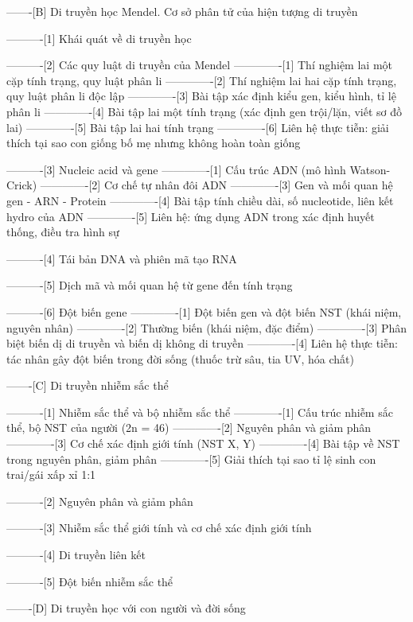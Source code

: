 -------[B] Di truyền học Mendel. Cơ sở phân tử của hiện tượng di truyền

----------[1] Khái quát về di truyền học

----------[2] Các quy luật di truyền của Mendel
-------------[1] Thí nghiệm lai một cặp tính trạng, quy luật phân li
-------------[2] Thí nghiệm lai hai cặp tính trạng, quy luật phân li độc lập
-------------[3] Bài tập xác định kiểu gen, kiểu hình, tỉ lệ phân li
-------------[4] Bài tập lai một tính trạng (xác định gen trội/lặn, viết sơ đồ lai)
-------------[5] Bài tập lai hai tính trạng
-------------[6] Liên hệ thực tiễn: giải thích tại sao con giống bố mẹ nhưng không hoàn toàn giống

----------[3] Nucleic acid và gene
-------------[1] Cấu trúc ADN (mô hình Watson-Crick)
-------------[2] Cơ chế tự nhân đôi ADN
-------------[3] Gen và mối quan hệ gen - ARN - Protein
-------------[4] Bài tập tính chiều dài, số nucleotide, liên kết hydro của ADN
-------------[5] Liên hệ: ứng dụng ADN trong xác định huyết thống, điều tra hình sự

----------[4] Tái bản DNA và phiên mã tạo RNA

----------[5] Dịch mã và mối quan hệ từ gene đến tính trạng

----------[6] Đột biến gene
-------------[1] Đột biến gen và đột biến NST (khái niệm, nguyên nhân)
-------------[2] Thường biến (khái niệm, đặc điểm)
-------------[3] Phân biệt biến dị di truyền và biến dị không di truyền
-------------[4] Liên hệ thực tiễn: tác nhân gây đột biến trong đời sống (thuốc trừ sâu, tia UV, hóa chất)

-------[C] Di truyền nhiễm sắc thể

----------[1] Nhiễm sắc thể và bộ nhiễm sắc thể
-------------[1] Cấu trúc nhiễm sắc thể, bộ NST của người (2n = 46)
-------------[2] Nguyên phân và giảm phân
-------------[3] Cơ chế xác định giới tính (NST X, Y)
-------------[4] Bài tập về NST trong nguyên phân, giảm phân
-------------[5] Giải thích tại sao tỉ lệ sinh con trai/gái xấp xỉ 1:1

----------[2] Nguyên phân và giảm phân

----------[3] Nhiễm sắc thể giới tính và cơ chế xác định giới tính

----------[4] Di truyền liên kết

----------[5] Đột biến nhiễm sắc thể

-------[D] Di truyền học với con người và đời sống

